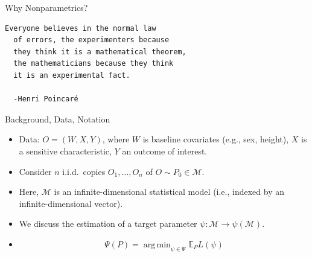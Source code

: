 \documentclass[12pt,t]{beamer}
\newcommand{\E}{\mathbb{E}}
\DeclareMathOperator*{\argmin}{arg\,min}
\begin{document}

\begin{frame}[fragile,c]{Why Nonparametrics?}

\begin{center}
\begin{minipage}[c]{10.7cm}
\begin{semiverbatim}
\lstset{basicstyle=\normalsize}
\begin{lstlisting}[linewidth=10.7cm]
  Everyone believes in the normal law
  of errors, the experimenters because
  they think it is a mathematical theorem,
  the mathematicians because they think
  it is an experimental fact.

  -Henri Poincaré
\end{lstlisting}
\end{semiverbatim}
\end{minipage}
\end{center}


\end{frame}


\begin{frame}[c]{Background, Data, Notation}

\begin{center}
\begin{itemize}
  \itemsep12pt
  \item Data: $O = (W, X, Y)$, where $W$ is baseline covariates (e.g., sex,
    height), $X$ is a sensitive characteristic, $Y$ an outcome of interest.
  \item Consider $n$ i.i.d.~copies $O_1, \dots, O_n$ of $O \sim P_0 \in
    \mathcal{M}$.
  \item Here, $\mathcal{M}$ is an infinite-dimensional statistical model (i.e.,
    indexed by an infinite-dimensional vector).
  \item We discuss the estimation of a target parameter $\psi : \mathcal{M}
    \rightarrow \psi(\mathcal{M})$.
  \item $$ \Psi(P) = \argmin_{\psi \in \Psi} \E_PL(\psi)$$
\end{itemize}
\end{center}


\end{frame}
\end{document}
